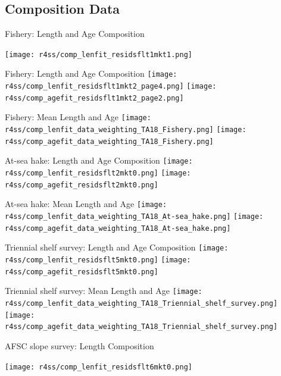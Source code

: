 \documentclass[pdf]{beamer}\usepackage[]{graphicx}\usepackage[]{color}
\begin{document}
\subsection{Composition Data}
\begin{frame}{Fishery: Length and Age Composition}
  \begin{center}
  \texttt{[image: r4ss/comp\_lenfit\_residsflt1mkt1.png]}
  \end{center}
\end{frame}

\begin{frame}{Fishery: Length and Age Composition}
  \texttt{[image: r4ss/comp\_lenfit\_residsflt1mkt2\_page4.png]}
  \texttt{[image: r4ss/comp\_agefit\_residsflt1mkt2\_page2.png]}
\end{frame}

\begin{frame}{Fishery: Mean Length and Age}
  \texttt{[image: r4ss/comp\_lenfit\_data\_weighting\_TA18\_Fishery.png]}
  \texttt{[image: r4ss/comp\_agefit\_data\_weighting\_TA18\_Fishery.png]}
\end{frame}

\begin{frame}{At-sea hake: Length and Age Composition}
  \texttt{[image: r4ss/comp\_lenfit\_residsflt2mkt0.png]}
  \texttt{[image: r4ss/comp\_agefit\_residsflt2mkt0.png]}
\end{frame}

\begin{frame}{At-sea hake: Mean Length and Age}
  \texttt{[image: r4ss/comp\_lenfit\_data\_weighting\_TA18\_At-sea\_hake.png]}
  \texttt{[image: r4ss/comp\_agefit\_data\_weighting\_TA18\_At-sea\_hake.png]}
\end{frame}

\begin{frame}{Triennial shelf survey: Length and Age Composition}
  \texttt{[image: r4ss/comp\_lenfit\_residsflt5mkt0.png]}
  \texttt{[image: r4ss/comp\_agefit\_residsflt5mkt0.png]}
\end{frame}

\begin{frame}{Triennial shelf survey: Mean Length and Age}
  \texttt{[image: r4ss/comp\_lenfit\_data\_weighting\_TA18\_Triennial\_shelf\_survey.png]}
  \texttt{[image: r4ss/comp\_agefit\_data\_weighting\_TA18\_Triennial\_shelf\_survey.png]}
\end{frame}

\begin{frame}{AFSC slope survey: Length Composition}
  \begin{center}
  \texttt{[image: r4ss/comp\_lenfit\_residsflt6mkt0.png]}
  \end{center}
\end{frame}
\end{document}
